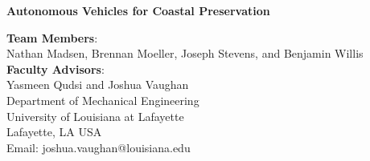 \documentclass[12 pt]{article}
\begin{document}
\begin{center}
{\LARGE \bf Autonomous Vehicles for Coastal Preservation}

\textbf{Team Members}:\\Nathan Madsen, Brennan Moeller, Joseph Stevens, and Benjamin Willis\\
\vspace{0.1in}
\textbf{Faculty Advisors}:\\Yasmeen Qudsi and Joshua Vaughan \\

\vspace{0.1in}
\footnotesize{Department of Mechanical Engineering\\
University of Louisiana at Lafayette\\
Lafayette, LA USA\\
Email: joshua.vaughan@louisiana.edu}
\end{center}



\pagestyle{plain}
\cfoot{\thepage}

\begin{abstract}
\vspace{-0.2in}
The work proposed here seeks to improve the safety and efficiency of autonomous surface vessels used to monitor wetlands through the addition of an OAK-D camera. The OAK-D would increase the efficiency of the autonomous system by reducing the computational load on the on-board computers, thereby increasing the computational power available for both the scientific mission on the boat and the addition of more peripherals to enhance the safety. This addition would also help improve the localization precision the surface vessel by enabling more sensors, such as LiDAR, to be added with the same computational resources and power requirements. The overall system would be able to achieve safer and more efficient coastal monitoring with the addition of an OAK-D camera. 
\end{abstract}

\end{document}
